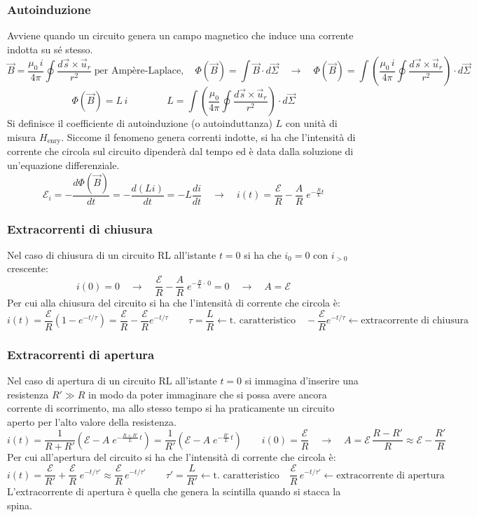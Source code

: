 \documentclass[a4paper]{article}
\newcommand\ur{\vec{u}_r}
\begin{document}
\subsubsection*{Autoinduzione}
Avviene quando un circuito genera un campo magnetico che induce una corrente indotta su sé stesso.
\[\vec{B} = \frac{\mu_0 \, i}{4 \pi} \oint \frac{d\vec{s} \times \ur}{r^2} \; \text{per Ampère-Laplace}, \quad \Phi(\vec{B}) = \int \vec{B} \cdot d\vec{\Sigma} \quad \rightarrow \quad \Phi(\vec{B}) = \int \left(\frac{\mu_0 \, i}{4 \pi} \oint \frac{d\vec{s} \times \ur}{r^2}\right) \cdot d\vec{\Sigma}\]
\[\Phi(\vec{B}) = L \, i \qquad\qquad L = \int \left(\frac{\mu_0}{4 \pi} \oint \frac{d\vec{s} \times \ur}{r^2}\right) \cdot d\vec{\Sigma}\]
Si definisce il coefficiente di autoinduzione (o autoinduttanza) \(L\) con unità di misura \(H_\text{enry}\). Siccome il fenomeno
genera correnti indotte, si ha che l'intensità di corrente che circola sul circuito dipenderà dal tempo ed è data dalla soluzione
di un'equazione differenziale.
\[\mathcal{E}_i = -\frac{d\Phi(\vec{B})}{dt} = -\frac{d(Li)}{dt} = -L \frac{di}{dt} \quad \rightarrow \quad i(t) = \frac{\mathcal{E}}{R} - \frac{A}{R} \; e^{-\frac{R}{L} t}\]

\subsubsection*{Extracorrenti di chiusura}
Nel caso di chiusura di un circuito RL all'istante \(t = 0\) si ha che \(i_0 = 0\) con \(i_{>0}\) crescente:
\[i(0) = 0 \quad\rightarrow\quad \frac{\mathcal{E}}{R} - \frac{A}{R} \; e^{-\frac{R}{L} \cdot\, 0} = 0 \quad\rightarrow\quad A = \mathcal{E}\]
Per cui alla chiusura del circuito si ha che l'intensità di corrente che circola è:
\[i(t) = \frac{\mathcal{E}}{R} (1-e^{-t/\tau}) = \frac{\mathcal{E}}{R} - \frac{\mathcal{E}}{R} e^{-t/\tau} \qquad \tau=\frac{L}{R} \leftarrow \text{t. caratteristico} \quad - \frac{\mathcal{E}}{R} e^{-t/\tau} \leftarrow \text{extracorrente di chiusura}\]

\subsubsection*{Extracorrenti di apertura}
Nel caso di apertura di un circuito RL all'istante \(t = 0\) si immagina d'inserire una resistenza \(R' \gg R\) in modo da poter
immaginare che si possa avere ancora corrente di scorrimento, ma allo stesso tempo si ha praticamente un circuito aperto per
l'alto valore della resistenza.
\[i(t) = \frac{1}{R + R'} \left(\mathcal{E} - A \; e^{-\frac{R+R'}{L} \, t}\right) = \frac{1}{R'} \left(\mathcal{E} - A \; e^{-\frac{R'}{L} \, t}\right) \qquad i(0) = \frac{\mathcal{E}}{R} \quad \rightarrow \quad A = \mathcal{E}\,\frac{R - R'}{R} \approx \mathcal{E} - \frac{R'}{R}\]
Per cui all'apertura del circuito si ha che l'intensità di corrente che circola è:
\[i(t) = \frac{\mathcal{E}}{R'}  + \frac{\mathcal{E}}{R} \; e^{-t/\tau'} \approx \frac{\mathcal{E}}{R} \, e^{-t/\tau'} \qquad \tau' = \frac{L}{R'} \leftarrow \text{t. caratteristico} \quad \frac{\mathcal{E}}{R} \, e^{-t/\tau'} \leftarrow \text{extracorrente di apertura}\]
L'extracorrente di apertura è quella che genera la scintilla quando si stacca la spina.
\end{document}
